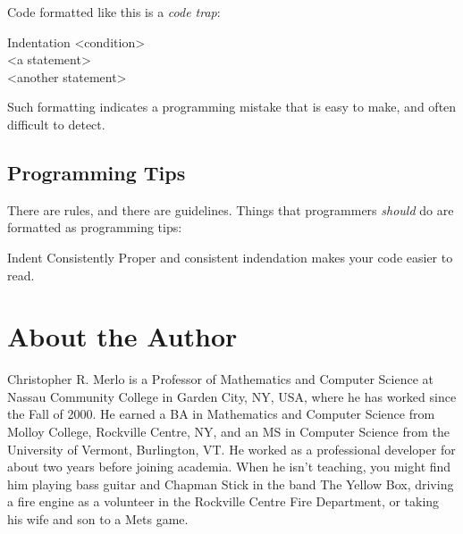 Code formatted like this is a \textit{code trap}:
\begin{trap*}{Indentation}
<condition>\\
\phantom{xxxx}<a statement>\\
\phantom{xxxx}<another statement>
\end{trap*}

Such formatting indicates a programming mistake that is easy to make, and often difficult to detect.

\subsection*{Programming Tips}

There are rules, and there are guidelines.  Things that programmers \textit{should} do are formatted as programming tips:

\begin{tip*}{Indent Consistently}
    Proper and consistent indendation makes your code easier to read.
\end{tip*}

\section{About the Author}

Christopher R. Merlo is a Professor of Mathematics and Computer Science at Nassau Community College in Garden City, NY, USA, where he has worked since the Fall of 2000.  He earned a BA in Mathematics and Computer Science from Molloy College, Rockville Centre, NY, and an MS in Computer Science from the University of Vermont, Burlington, VT.  He worked as a professional developer for about two years before joining academia.  When he isn't teaching, you might find him playing bass guitar and Chapman Stick in the band The Yellow Box, driving a fire engine as a volunteer in the Rockville Centre Fire Department, or taking his wife and son to a Mets game.
